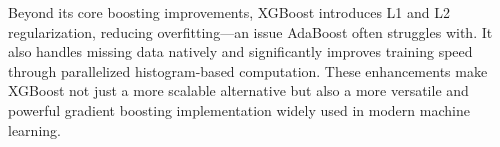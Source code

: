 \documentclass{../template/texnote}
\begin{document}
Beyond its core boosting improvements, XGBoost introduces L1 and L2 regularization, reducing overfitting—an issue AdaBoost often struggles with. It also handles missing data natively and significantly improves training speed through parallelized histogram-based computation. These enhancements make XGBoost not just a more scalable alternative but also a more versatile and powerful gradient boosting implementation widely used in modern machine learning.

%
    \printbibliography
\end{document}
